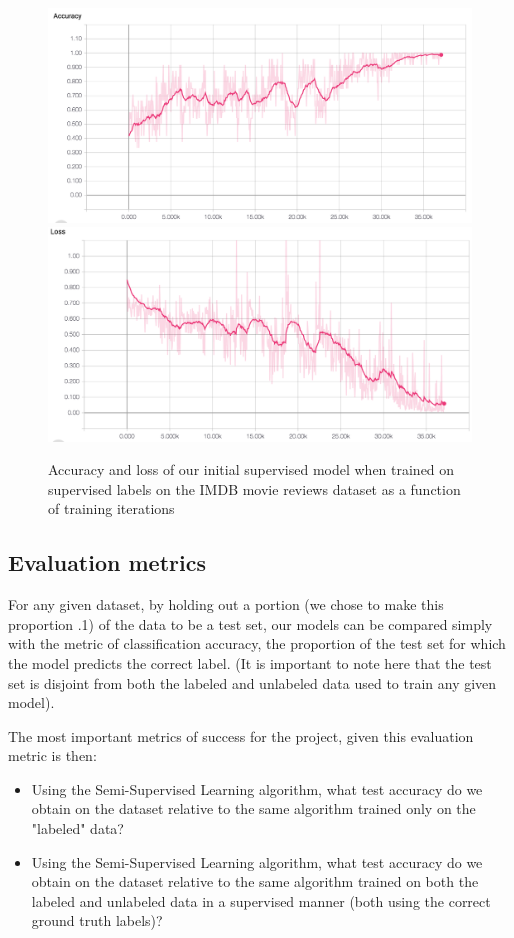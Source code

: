 \documentclass[11pt,letterpaper]{article}
\begin{document}
\begin{figure}
	\includegraphics[scale = .27]{accuracy}
	\includegraphics[scale = .27]{loss}
	\caption{Accuracy and loss of our initial supervised model when trained on supervised labels on the IMDB movie reviews dataset as a function of training iterations}
\end{figure}

\subsection{Evaluation metrics}

For any given dataset, by holding out a portion (we chose to make this proportion .1) of the data to be a test set, our models can be compared simply with the metric of classification accuracy, the proportion of the test set for which the model predicts the correct label. (It is important to note here that the test set is disjoint from both the labeled and unlabeled data used to train any given model).

The most important metrics of success for the project, given this evaluation metric is then:

\begin{itemize}
	\item Using the Semi-Supervised Learning algorithm, what test accuracy do we obtain on the dataset relative to the same algorithm trained only on the "labeled" data?
	\item Using the Semi-Supervised Learning algorithm, what test accuracy do we obtain on the dataset relative to the same algorithm trained on both the labeled and unlabeled data in a supervised manner (both using the correct ground truth labels)?


\end{itemize}
\end{document}
